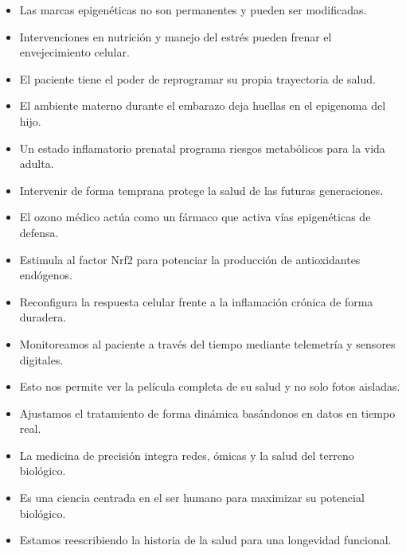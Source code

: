 \begin{itemize}
    \item Las marcas epigenéticas no son permanentes y pueden ser modificadas.
    \item Intervenciones en nutrición y manejo del estrés pueden frenar el envejecimiento celular.
    \item El paciente tiene el poder de reprogramar su propia trayectoria de salud.
\end{itemize}

\begin{itemize}
    \item El ambiente materno durante el embarazo deja huellas en el epigenoma del hijo.
    \item Un estado inflamatorio prenatal programa riesgos metabólicos para la vida adulta.
    \item Intervenir de forma temprana protege la salud de las futuras generaciones.
\end{itemize}

\begin{itemize}
    \item El ozono médico actúa como un fármaco que activa vías epigenéticas de defensa.
    \item Estimula al factor Nrf2 para potenciar la producción de antioxidantes endógenos.
    \item Reconfigura la respuesta celular frente a la inflamación crónica de forma duradera.
\end{itemize}

\begin{itemize}
    \item Monitoreamos al paciente a través del tiempo mediante telemetría y sensores digitales.
    \item Esto nos permite ver la película completa de su salud y no solo fotos aisladas.
    \item Ajustamos el tratamiento de forma dinámica basándonos en datos en tiempo real.
\end{itemize}

\begin{itemize}
    \item La medicina de precisión integra redes, ómicas y la salud del terreno biológico.
    \item Es una ciencia centrada en el ser humano para maximizar su potencial biológico.
    \item Estamos reescribiendo la historia de la salud para una longevidad funcional.
\end{itemize}

